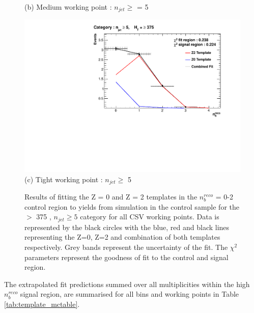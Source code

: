 \begin{figure}[ht]
\begin{minipage}[b]{0.51\linewidth}
\centering (b) Medium working point : $n_{jet} \geq$ = 5 
\end{minipage}
\footnotesize
\centering
\begin{minipage}[b]{0.51\linewidth}
\centering
\includegraphics[width = 1.0\linewidth]{plots/ThesisPlots/Final_Fit_To_MC_Normal_Tight_HTBin_OneMuon_Template_375_jet_mult_5.pdf}
\centering (c) Tight working point : $n_{jet} \geq$ 5 
\end{minipage}
\caption[Results of fitting the Z = 0 and Z = 2 templates in the $n_{b}^{reco}$ = 0-2 control region to yields from simulation in the \mupjets control sample for the \theht $>$ 375 \GeV, $n_{jet} \geq 5$ category for all \ac{CSV} working points.]{Results of fitting the Z = 0 and Z = 2 templates in the $n_{b}^{reco}$ = 0-2 control region to yields from simulation in the \mupjets control sample for the \theht $>$ 375 \GeV, $n_{jet} \geq 5$ category  for all \ac{CSV} working points. Data is represented by the black circles with the blue, red and black lines representing the Z=0, Z=2 and combination of both templates respectively. Grey bands represent the uncertainty of the fit. The $\chi^{2}$ parameters represent the goodness of fit to the control and signal region.}
\label{fig:template_closure_njet5}
\end{figure}
\FloatBarrier

The extrapolated fit predictions summed over all \njet multiplicities within the high $n_{b}^{reco}$ signal region, are summarised for all \theht bins and working points in Table \ref{tab:template_mctable}. 

